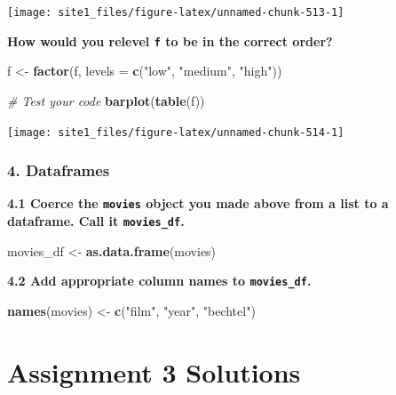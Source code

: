 \documentclass[]{book}
\newenvironment{Shaded}{\begin{snugshade}}{\end{snugshade}}
\newcommand{\KeywordTok}[1]{\textcolor[rgb]{0.13,0.29,0.53}{\textbf{#1}}}
\newcommand{\DataTypeTok}[1]{\textcolor[rgb]{0.13,0.29,0.53}{#1}}
\newcommand{\StringTok}[1]{\textcolor[rgb]{0.31,0.60,0.02}{#1}}
\newcommand{\CommentTok}[1]{\textcolor[rgb]{0.56,0.35,0.01}{\textit{#1}}}
\newcommand{\NormalTok}[1]{#1}
\begin{document}
\begin{center}\texttt{[image: site1\_files/figure-latex/unnamed-chunk-513-1]} \end{center}

\textbf{How would you relevel \texttt{f} to be in the correct order?}

\begin{Shaded}
\begin{Highlighting}[]
\NormalTok{f <-}\StringTok{ }\KeywordTok{factor}\NormalTok{(f, }\DataTypeTok{levels =} \KeywordTok{c}\NormalTok{(}\StringTok{"low"}\NormalTok{, }\StringTok{"medium"}\NormalTok{, }\StringTok{"high"}\NormalTok{))}

\CommentTok{# Test your code}
\KeywordTok{barplot}\NormalTok{(}\KeywordTok{table}\NormalTok{(f))}
\end{Highlighting}
\end{Shaded}

\begin{center}\texttt{[image: site1\_files/figure-latex/unnamed-chunk-514-1]} \end{center}

\subsubsection*{4. Dataframes}\label{dataframes-1}

\textbf{4.1 Coerce the \texttt{movies} object you made above from a list
to a dataframe. Call it \texttt{movies\_df}.}

\begin{Shaded}
\begin{Highlighting}[]
\NormalTok{movies_df <-}\StringTok{ }\KeywordTok{as.data.frame}\NormalTok{(movies)}
\end{Highlighting}
\end{Shaded}

\textbf{4.2 Add appropriate column names to \texttt{movies\_df}.}

\begin{Shaded}
\begin{Highlighting}[]
\KeywordTok{names}\NormalTok{(movies) <-}\StringTok{ }\KeywordTok{c}\NormalTok{(}\StringTok{"film"}\NormalTok{, }\StringTok{"year"}\NormalTok{, }\StringTok{"bechtel"}\NormalTok{)}
\end{Highlighting}
\end{Shaded}

\section{Assignment 3 Solutions}\label{assignment-3-solutions}
\end{document}
